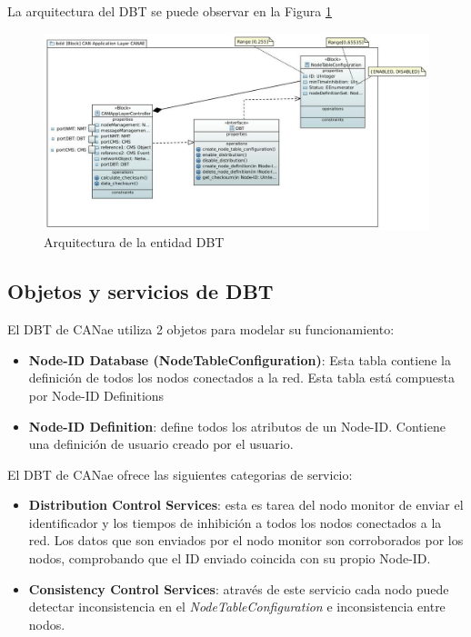 La arquitectura del DBT se puede observar en la Figura \ref{fig:DBT}

\begin{figure}[h!]
 \centering
 \includegraphics[scale=0.4]{images/Secciones/AppendixA/DBT.JPG}
  \caption{Arquitectura de la entidad DBT}
\label{fig:DBT}
\end{figure} 

\subsection{Objetos y servicios de DBT}
El DBT de CANae utiliza 2 objetos para modelar su funcionamiento:
\begin{itemize}
\item \textbf{Node-ID Database (NodeTableConfiguration)}: Esta tabla contiene la
  definición de todos los nodos conectados a la red. Esta tabla está compuesta
  por Node-ID Definitions
\item \textbf{Node-ID Definition}: define todos los atributos de un Node-ID.
  Contiene una definición de usuario creado por el usuario.
\end{itemize}

El DBT de CANae ofrece las siguientes categorias de servicio:
\begin{itemize}
\item \textbf{Distribution Control Services}: esta es tarea del nodo monitor de
  enviar el identificador y los tiempos de inhibición a todos los nodos
  conectados a la red. Los datos que son enviados por el nodo monitor son
  corroborados por los nodos, comprobando que el ID enviado coincida con su
  propio Node-ID.
\item \textbf{Consistency Control Services}: através de este servicio cada nodo
  puede detectar inconsistencia en el \textit{NodeTableConfiguration} e inconsistencia
  entre nodos.
\end{itemize}

